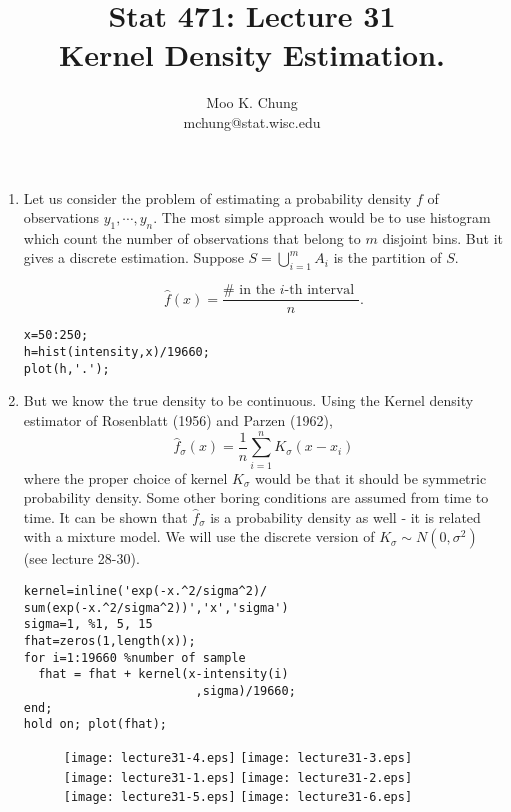 \documentclass[10pt,twocolumn]{article} %
\begin{document}
\title{Stat 471: Lecture 31\\
Kernel Density Estimation.}
\author{Moo K. Chung\\
mchung@stat.wisc.edu}
\maketitle \thispagestyle{empty}
\begin{enumerate}
\item Let us consider the problem of estimating a probability
density $f$ of observations $y_1, \cdots,y_n$. The most simple
approach would be to use histogram which count the number of
observations that belong to $m$ disjoint bins. But it gives a
discrete estimation. Suppose $S=\bigcup_{i=1}^m A_i$ is the
partition of $S$.

$$\hat f(x) =\frac{\# \mbox{ in the }i \mbox{-th interval }}{n}.$$

\begin{verbatim}
x=50:250;
h=hist(intensity,x)/19660;
plot(h,'.');
\end{verbatim}
\item  But we know the true density to be continuous. Using the
Kernel density estimator of Rosenblatt (1956) and Parzen (1962),
$$ \hat f_{\sigma} (x) = \frac{1}{n}\sum_{i=1}^n K_{\sigma}(x -
x_i)$$ where the proper choice of kernel $K_{\sigma}$ would be
that it should be symmetric probability density. Some other boring
conditions are assumed from time to time. It can be shown that
$\hat f_{\sigma}$ is a probability density as well - it is related
with a mixture model. We will use the discrete version of
$K_{\sigma} \sim N(0,\sigma^2)$ (see lecture 28-30).
\begin{verbatim}
kernel=inline('exp(-x.^2/sigma^2)/
sum(exp(-x.^2/sigma^2))','x','sigma')
sigma=1, %1, 5, 15
fhat=zeros(1,length(x));
for i=1:19660 %number of sample
  fhat = fhat + kernel(x-intensity(i)
                        ,sigma)/19660;
end;
hold on; plot(fhat);
\end{verbatim}

\begin{figure}[t]
\centering
\renewcommand{\baselinestretch}{1}
\texttt{[image: lecture31-4.eps]}
\texttt{[image: lecture31-3.eps]}
\texttt{[image: lecture31-1.eps]}
\texttt{[image: lecture31-2.eps]}
\texttt{[image: lecture31-5.eps]}
\texttt{[image: lecture31-6.eps]}
\end{figure}


\end{enumerate}
\end{document}
